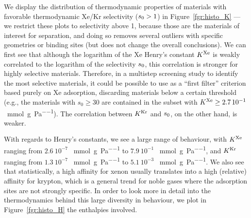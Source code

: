 \documentclass[main]{subfiles}
\begin{document}
We display the distribution of thermodynamic properties of materials with favorable thermodynamic Xe/Kr selectivity ($s_{\text{0}} > 1$) in Figure~\ref{fgr:histo_K} --- we restrict these plots to selectivity above 1, because those are the materials of interest for separation, and doing so removes several outliers with specific geometries or binding sites (but does not change the overall conclusions). We can first see that although the logarithm of the Xe Henry's constant $K^{\text{Xe}}$ is weakly correlated to the logarithm of the selectivity $s_{\text{0}}$, this correlation is stronger for highly selective materials. Therefore, in a multistep screening study to identify the most selective materials, it could be possible to use as a ``first filter'' criterion based purely on Xe adsorption, discarding materials below a certain threshold (e.g., the materials with $s_0\ge30$ are contained in the subset with $K^{\text{Xe}}\ge2.7\,10^{-1}$~\si{\milli\mol\per\gram\per\pascal}). The correlation between $K^{\text{Kr}}$ and $s_{\text{0}}$, on the other hand, is weaker.

With regards to Henry's constants, we see a large range of behaviour, with $K^{\text{Xe}}$ ranging from $2.6\ 10^{-7}$ \SI{}{\milli\mol\per\gram\per\pascal} to $7.9\ 10^{-1}$ \SI{}{\milli\mol\per\gram\per\pascal}, and $K^{\text{Kr}}$ ranging from $1.3\ 10^{-7}$ \SI{}{\milli\mol\per\gram\per\pascal} to $5.1\ 10^{-3}$ \SI{}{\milli\mol\per\gram\per\pascal}. We also see that statistically, a high affinity for xenon usually translates into a high (relative) affinity for krypton, which is a general trend for noble gases where the adsorption sites are not strongly specific. In order to look more in detail into the thermodynamics behind this large diversity in behaviour, we plot in Figure~\ref{fgr:histo_H} the enthalpies involved.
\end{document}

